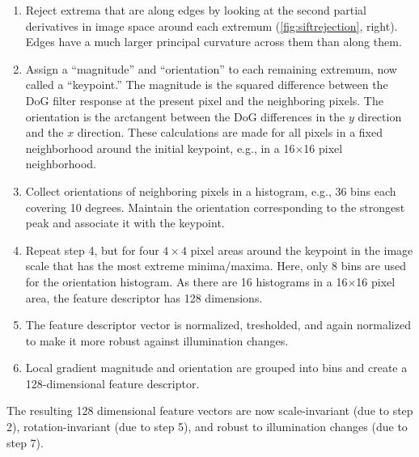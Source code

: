 \begin{enumerate}
\item Reject extrema that are along edges by looking at the second partial derivatives in image space around each extremum (\cref{fig:siftrejection}, right). Edges have a much larger principal curvature across them than along them.
\item Assign a ``magnitude'' and ``orientation'' to each remaining extremum, now called a ``keypoint.'' The magnitude is the squared difference between the DoG filter response at the present pixel and the neighboring pixels. The orientation is the arctangent between the DoG differences in the $y$ direction and the $x$ direction. These calculations are made for all pixels in a fixed neighborhood around the initial keypoint, e.g., in a 16$\times$16 pixel neighborhood.
\item Collect orientations of neighboring pixels in a histogram, e.g., 36 bins each covering 10 degrees. Maintain the orientation corresponding to the strongest peak and associate it with the keypoint.
\item Repeat step 4, but for four $4\times4$ pixel areas around the keypoint in the image scale that has the most extreme minima/maxima. Here, only 8 bins are used for the orientation histogram. As there are 16 histograms in a 16$\times$16 pixel area, the feature descriptor has 128 dimensions.
\item The feature descriptor vector is normalized, tresholded, and again normalized to make it more robust against illumination changes.
\item Local gradient magnitude and orientation are grouped into bins and create a 128-dimensional feature descriptor.
\end{enumerate}

The resulting 128 dimensional feature vectors are now scale-invariant (due to step 2), rotation-invariant (due to step 5), and robust to illumination changes (due to step 7).

